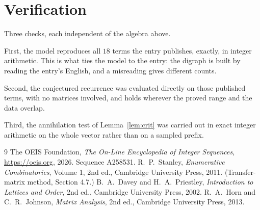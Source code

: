 \documentclass[11pt,a4paper]{article}
\theoremstyle{plain}
\theoremstyle{definition}
\begin{document}
\section{Verification}

Three checks, each independent of the algebra above.

First, the model reproduces all $18$ terms the entry publishes, exactly, in integer
arithmetic. This is what ties the model to the entry: the digraph is built by reading the
entry's English, and a misreading gives different counts.

Second, the conjectured recurrence was evaluated directly on those published terms, with no
matrices involved, and holds wherever the proved range and the data overlap.

Third, the annihilation test of Lemma~\ref{lem:crit} was carried out in exact integer
arithmetic on the whole vector rather than on a sampled prefix.

\begin{thebibliography}{9}
 The OEIS Foundation, \emph{The On-Line Encyclopedia of Integer
Sequences}, \url{https://oeis.org}, 2026. Sequence A258531.
 R.~P.~Stanley, \emph{Enumerative Combinatorics}, Volume 1, 2nd ed.,
Cambridge University Press, 2011. (Transfer-matrix method, Section 4.7.)
 B.~A.~Davey and H.~A.~Priestley, \emph{Introduction to Lattices and
Order}, 2nd ed., Cambridge University Press, 2002.
 R.~A.~Horn and C.~R.~Johnson, \emph{Matrix Analysis}, 2nd ed., Cambridge
University Press, 2013.
\end{thebibliography}
\end{document}
